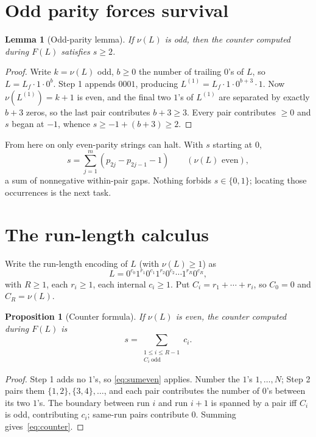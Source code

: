\documentclass[11pt,reqno]{amsart}
\theoremstyle{plain}
\newtheorem{proposition}{Proposition}
\newtheorem{lemma}{Lemma}
\theoremstyle{definition}
\theoremstyle{remark}
\begin{document}
\section{Odd parity forces survival}\label{sec:odd}
\begin{lemma}[Odd-parity lemma]\label{lem:odd}
If $\nu(L)$ is odd, then the counter computed during $F(L)$ satisfies $s\ge 2$.
\end{lemma}
\begin{proof}
Write $k=\nu(L)$ odd, $b\ge 0$ the number of trailing $0$'s of $L$, so $L=L_f\cdot 1\cdot 0^b$. Step 1 appends $0001$, producing $L^{(1)}=L_f\cdot 1\cdot 0^{b+3}\cdot 1$. Now $\nu(L^{(1)})=k+1$ is even, and the final two $1$'s of $L^{(1)}$ are separated by exactly $b+3$ zeros, so the last pair contributes $b+3\ge 3$. Every pair contributes $\ge 0$ and $s$ began at $-1$, whence $s\ge -1+(b+3)\ge 2$.
\end{proof}

From here on only even-parity strings can halt. With $s$ starting at $0$,
\begin{equation}\label{eq:sumeven}
s=\sum_{j=1}^{m}(p_{2j}-p_{2j-1}-1)\qquad(\nu(L)\text{ even}),
\end{equation}
a sum of nonnegative within-pair gaps. Nothing forbids $s\in\{0,1\}$; locating those occurrences is the next task.

\section{The run-length calculus}\label{sec:rl}
Write the run-length encoding of $L$ (with $\nu(L)\ge 1$) as
\begin{equation}\label{eq:rle}
L=0^{c_0}1^{r_1}0^{c_1}1^{r_2}0^{c_2}\cdots 1^{r_R}0^{c_R},
\end{equation}
with $R\ge 1$, each $r_i\ge 1$, each internal $c_i\ge 1$. Put $C_i=r_1+\cdots+r_i$, so $C_0=0$ and $C_R=\nu(L)$.

\begin{proposition}[Counter formula]\label{prop:counter}
If $\nu(L)$ is even, the counter computed during $F(L)$ is
\begin{equation}\label{eq:counter}
s=\sum_{\substack{1\le i\le R-1\\C_i\ \text{odd}}}c_i.
\end{equation}
\end{proposition}
\begin{proof}
Step 1 adds no $1$'s, so \eqref{eq:sumeven} applies. Number the $1$'s $1,\dots,N$; Step 2 pairs them $\{1,2\},\{3,4\},\dots$, and each pair contributes the number of $0$'s between its two $1$'s. The boundary between run $i$ and run $i+1$ is spanned by a pair iff $C_i$ is odd, contributing $c_i$; same-run pairs contribute $0$. Summing gives~\eqref{eq:counter}.
\end{proof}
\end{document}
